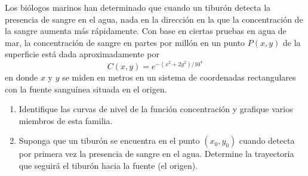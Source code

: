 \item Los biólogos marinos han determinado que cuando un tiburón detecta la presencia de sangre en el agua, nada en la dirección en la que la concentración de la sangre aumenta más rápidamente. Con base en ciertas pruebas en agua de mar, la concentración de sangre en partes por millón en un punto $P(x, y)$ de la superficie está dada aproximadamente por
    \[ C(x, y) = e^{-(x^2 + 2y^2)/10^4} \]
    en donde $x$ y $y$ se miden en metros en un sistema de coordenadas rectangulares con la fuente sanguínea situada en el origen.
    \begin{enumerate}
        \item[(a)] Identifique las curvas de nivel de la función concentración y grafique varios miembros de esta familia.
        \item[(b)] Suponga que un tiburón se encuentra en el punto $(x_0, y_0)$ cuando detecta por primera vez la presencia de sangre en el agua. Determine la trayectoria que seguirá el tiburón hacia la fuente (el origen).
    \end{enumerate}
